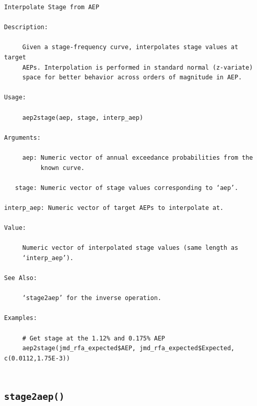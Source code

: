 \documentclass[
  letterpaper,
  DIV=11,
  numbers=noendperiod]{scrreprt}
\begin{document}
\begin{verbatim}
Interpolate Stage from AEP

Description:

     Given a stage-frequency curve, interpolates stage values at target
     AEPs. Interpolation is performed in standard normal (z-variate)
     space for better behavior across orders of magnitude in AEP.

Usage:

     aep2stage(aep, stage, interp_aep)
     
Arguments:

     aep: Numeric vector of annual exceedance probabilities from the
          known curve.

   stage: Numeric vector of stage values corresponding to ‘aep’.

interp_aep: Numeric vector of target AEPs to interpolate at.

Value:

     Numeric vector of interpolated stage values (same length as
     ‘interp_aep’).

See Also:

     ‘stage2aep’ for the inverse operation.

Examples:

     # Get stage at the 1.12% and 0.175% AEP
     aep2stage(jmd_rfa_expected$AEP, jmd_rfa_expected$Expected, c(0.0112,1.75E-3))
     
\end{verbatim}

\subsection{\texorpdfstring{\texttt{stage2aep()}}{stage2aep()}}\label{stage2aep}
\end{document}
